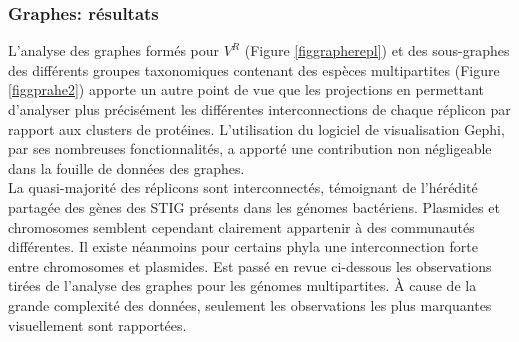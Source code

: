 \subsubsection{Graphes: résultats}\label{graphres}
	L'analyse des graphes formés pour $V^{R}$ (Figure \ref{figgrapherepl}) et des sous-graphes des différents groupes taxonomiques contenant des espèces multipartites (Figure \ref{figgprahe2}) apporte un autre point de vue que les projections en permettant d'analyser plus précisément les différentes interconnections de chaque réplicon par rapport aux clusters de protéines. L'utilisation du logiciel de visualisation Gephi, par ses nombreuses fonctionnalités, a apporté une contribution non négligeable dans la fouille de données des graphes.\\

 La quasi-majorité des réplicons sont interconnectés, témoignant de l'hérédité partagée des gènes des STIG présents dans les génomes bactériens. Plasmides et chromosomes semblent cependant clairement appartenir à des communautés différentes. Il existe néanmoins pour certains phyla une interconnection forte entre chromosomes et plasmides. Est passé en revue ci-dessous les observations tirées de l'analyse des graphes pour les génomes multipartites. À cause de la grande complexité des données, seulement les observations les plus marquantes visuellement sont rapportées. 
 
